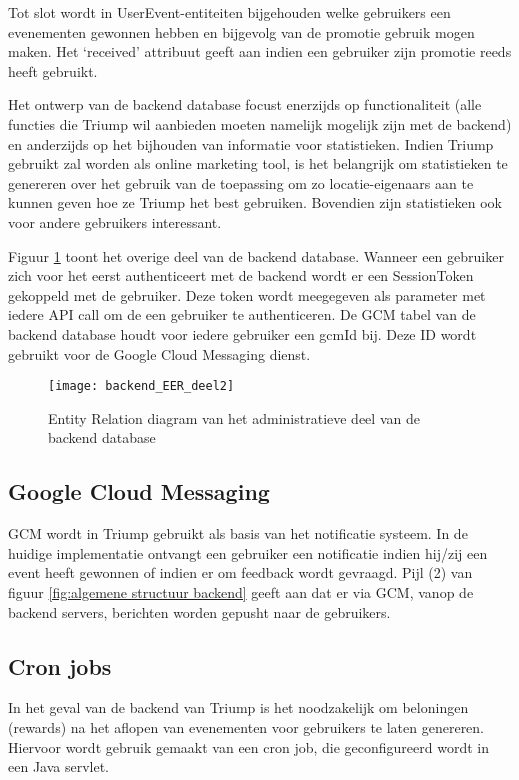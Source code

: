 Tot slot wordt in UserEvent-entiteiten bijgehouden welke gebruikers een evenementen gewonnen hebben en bijgevolg van de promotie gebruik mogen maken. Het `received' attribuut geeft aan indien een gebruiker zijn promotie reeds heeft gebruikt.

Het ontwerp van de backend database focust enerzijds op functionaliteit (alle functies die Triump wil aanbieden moeten namelijk mogelijk zijn met de backend) en anderzijds op het bijhouden van informatie voor statistieken. Indien Triump gebruikt zal worden als online marketing tool, is het belangrijk om statistieken te genereren over het gebruik van de toepassing om zo locatie-eigenaars aan te kunnen geven hoe ze Triump het best gebruiken. Bovendien zijn statistieken ook voor andere gebruikers interessant.

Figuur \ref{fig:Backend ER 2} toont het overige deel van de backend database. Wanneer een gebruiker zich voor het eerst authenticeert met de backend wordt er een SessionToken gekoppeld met de gebruiker. Deze token wordt meegegeven als parameter met iedere API call om de een gebruiker te authenticeren. De GCM tabel van de backend database houdt voor iedere gebruiker een gcmId bij. Deze ID wordt gebruikt voor de Google Cloud Messaging dienst.

\begin{figure}[H]
	\centering
	\texttt{[image: backend\_EER\_deel2]}
	\caption{Entity Relation diagram van het administratieve deel van de backend database}
	\label{fig:Backend ER 2}
\end{figure}
\subsection{Google Cloud Messaging}
GCM wordt in Triump gebruikt als basis van het notificatie systeem. In de huidige implementatie ontvangt een gebruiker een notificatie indien hij/zij een event heeft gewonnen of indien er om feedback wordt gevraagd. 
Pijl (2) van figuur \ref{fig:algemene structuur backend} geeft aan dat er via GCM, vanop de backend servers, berichten worden gepusht naar de gebruikers.

\subsection{Cron jobs}
In het geval van de backend van Triump is het noodzakelijk om beloningen (rewards) na het aflopen van evenementen voor gebruikers te laten genereren. Hiervoor wordt gebruik gemaakt van een cron job, die geconfigureerd wordt in een Java servlet. 

